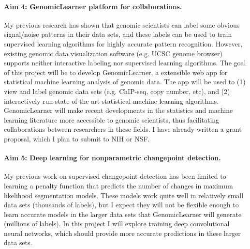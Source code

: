 \documentclass{article}
\begin{document}
\paragraph{Aim 4: GenomicLearner platform for collaborations.} My
previous research has shown that genomic scientists can label some
obvious signal/noise patterns in their data sets, and these labels can
be used to train supervised learning algorithms for highly accurate
pattern recognition. However, existing genomic data visualization
software (e.g. UCSC genome browser) supports neither interactive
labeling nor supervised learning algorithms. The goal of this project will be to
develop GenomicLearner, a extensible web app for statistical machine
learning analysis of genomic data. The app will be used to (1) view
and label genomic data sets (e.g. ChIP-seq, copy number, etc), and (2)
interactively run state-of-the-art statistical machine learning
algorithms. GenomicLearner will make recent developments in the
statistics and machine learning literature more accessible to genomic
scientists, thus facilitating collaborations between researchers in
these fields. I have already written a grant proposal,
which I plan to submit to NIH or NSF.


\paragraph{Aim 5: Deep learning for nonparametric changepoint
  detection.} My previous work on supervised changepoint detection has
been limited to learning a penalty function that predicts the number
of changes in maximum likelihood segmentation models. These models
work quite well in relatively small data sets (thousands of labels),
but I expect they will not be flexible enough to learn accurate models
in the larger data sets that GenomicLearner will generate
(millions of labels). In this project I will explore training deep
convolutional neural networks, which should provide more accurate
predictions in these larger data sets.




\end{document}
